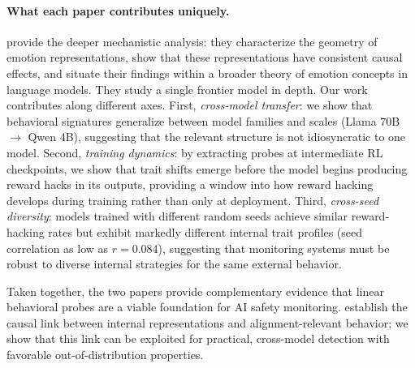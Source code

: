 \documentclass[11pt]{article}
\begin{document}
\paragraph{What each paper contributes uniquely.}
\cite{sofroniew2026emotion} provide the deeper mechanistic analysis: they characterize the geometry of emotion representations, show that these representations have consistent causal effects, and situate their findings within a broader theory of emotion concepts in language models.
They study a single frontier model in depth.
Our work contributes along different axes.
First, \emph{cross-model transfer}: we show that behavioral signatures generalize between model families and scales (Llama 70B $\to$ Qwen 4B), suggesting that the relevant structure is not idiosyncratic to one model.
Second, \emph{training dynamics}: by extracting probes at intermediate RL checkpoints, we show that trait shifts emerge before the model begins producing reward hacks in its outputs, providing a window into how reward hacking develops during training rather than only at deployment.
Third, \emph{cross-seed diversity}: models trained with different random seeds achieve similar reward-hacking rates but exhibit markedly different internal trait profiles (seed correlation as low as $r = 0.084$), suggesting that monitoring systems must be robust to diverse internal strategies for the same external behavior.

Taken together, the two papers provide complementary evidence that linear behavioral probes are a viable foundation for AI safety monitoring.
\cite{sofroniew2026emotion} establish the causal link between internal representations and alignment-relevant behavior; we show that this link can be exploited for practical, cross-model detection with favorable out-of-distribution properties.




\end{document}
